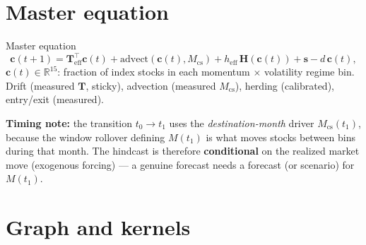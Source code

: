 \documentclass[10pt]{beamer}
\begin{document}
\section{Master equation}

\begin{frame}{Master equation}
  \small
  \begin{equation*}
    \mathbf{c}(t{+}1) = \mathbf{T}_{\mathrm{eff}}^{\!\top}\mathbf{c}(t)
    + \mathrm{advect}(\mathbf{c}(t), M_{\mathrm{cs}})
    + h_{\mathrm{eff}}\,\mathbf{H}(\mathbf{c}(t))
    + \mathbf{s} - d\,\mathbf{c}(t),
  \end{equation*}
  $\mathbf{c}(t) \in \mathbb{R}^{15}$: fraction of index stocks in each
  momentum $\times$ volatility regime bin.  Drift (measured $\mathbf{T}$,
  sticky), advection (measured $M_{\mathrm{cs}}$), herding (calibrated),
  entry/exit (measured).
  \vspace{0.6em}

  \textbf{Timing note:} the transition $t_0 \to t_1$ uses the
  \emph{destination-month} driver $M_{\mathrm{cs}}(t_1)$, because the window
  rollover defining $M(t_1)$ is what moves stocks between bins during that
  month.  The hindcast is therefore \textbf{conditional} on the realized
  market move (exogenous forcing) --- a genuine forecast needs a forecast
  (or scenario) for $M(t_1)$.
\end{frame}

\section{Graph and kernels}
\end{document}
